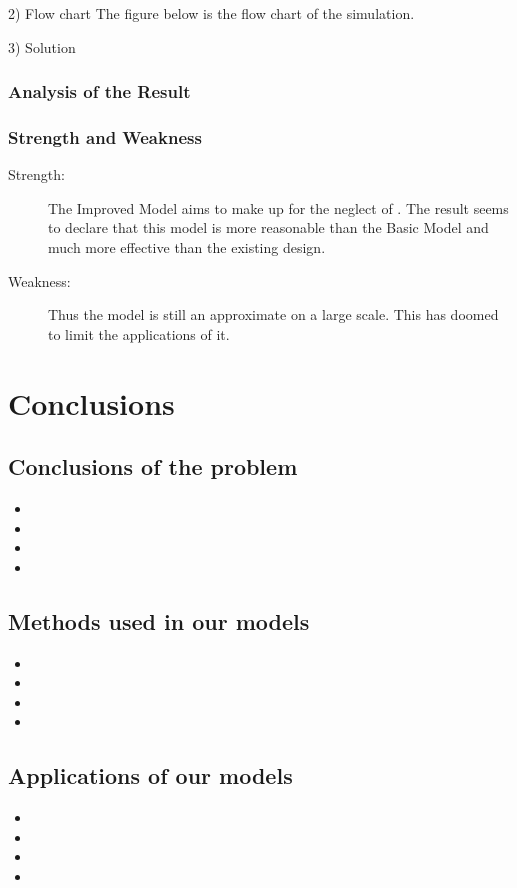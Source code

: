 \documentclass{tzmcmthesis}
\begin{document}
2) Flow chart
The figure below is the flow chart of the simulation.




3) Solution



\subsubsection{Analysis of the Result}



\subsubsection{Strength and Weakness}
\begin{description}
\item[Strength:] The Improved Model aims to make up for the neglect of         . The result seems to declare that this model is more reasonable than the Basic Model and much more effective than the existing design.
\item[Weakness:] Thus the model is still an approximate on a large scale. This has doomed to limit the applications of it.
\end{description}

\section{Conclusions}

\subsection{Conclusions of the problem}
\begin{itemize}
\item 	
\item
\item
\item
\end{itemize}	
\subsection{Methods used in our models}
\begin{itemize}
\item 	
\item
\item
\item
\end{itemize}
\subsection{Applications of our models}
\begin{itemize}
\item 	
\item
\item
\item
\end{itemize}
\end{document}
